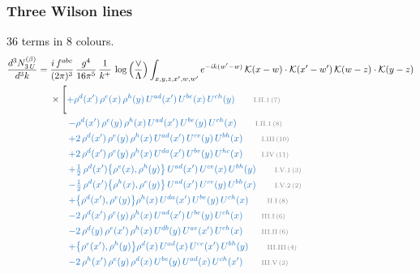 \documentclass[10pt]{article}
\begin{document}
\subsubsection{Three Wilson lines}
36 terms in 8 colours.
\begin{align}
\frac{d^{3}N^{(\beta)}_{3\,U}}{d^{3}k}={}&\frac{i\,f^{abc}}{(2\pi)^{3}}\,\frac{g^{4}}{16\pi^{5}}\,\frac{1}{k^{+}}\,\log\Big(\frac{\vee}{\Lambda}\Big)\int_{x,y,z,x',w,w'}e^{-ik(w'-w)}\,\mathcal{K}(x-w)\cdot\mathcal{K}(x'-w')\,\mathcal{K}(w-z)\cdot\mathcal{K}(y-z)\notag\\
&\times\Bigg[{\color{RoyalBlue}+\rho^{d}(x')\,\rho^{e}(x)\,\rho^{h}(y)\,U^{ad}(x')\,U^{be}(x)\,U^{ch}(y)}\tag*{\color{gray}\scriptsize I.II.1\,(7)}\\
&\qquad{\color{RoyalBlue}-\rho^{d}(x')\,\rho^{e}(y)\,\rho^{h}(x)\,U^{ad}(x')\,U^{be}(y)\,U^{ch}(x)}\tag*{\color{gray}\scriptsize I.II.1\,(8)}\\
&\qquad{\color{RoyalBlue}+2\,\rho^{d}(x')\,\rho^{e}(y)\,\rho^{h}(x)\,U^{ad}(x')\,U^{ce}(y)\,U^{bh}(x)}\tag*{\color{gray}\scriptsize I.III\,(10)}\\
&\qquad{\color{RoyalBlue}+2\,\rho^{d}(x')\,\rho^{e}(y)\,\rho^{h}(x)\, U^{da}(x')\,U^{be}(y)\,U^{hc}(x)}\tag*{\color{gray}\scriptsize I.IV\,(11)}\\
&\qquad{\color{RoyalBlue}+\tfrac{1}{2}\,\rho^{d}(x')\big\{\rho^{e}(x),\rho^{h}(y)\big\}\,U^{ad}(x')\,U^{ce}(x)\,U^{bh}(y)}\tag*{\color{gray}\scriptsize I.V.1\,(3)}\\
&\qquad{\color{RoyalBlue}-\tfrac{1}{2}\,\rho^{d}(x')\big\{\rho^{h}(x),\rho^{e}(y)\big\}\,U^{ad}(x')\,U^{ce}(y)\,U^{bh}(x)}\tag*{\color{gray}\scriptsize I.V.2\,(2)}\\
&\qquad{\color{RoyalBlue}+\big\{\rho^{d}(x'),\rho^{e}(y)\big\}\rho^{h}(x)\,U^{da}(x')\,U^{be}(y)\,U^{ch}(x)}\tag*{\color{gray}\scriptsize II.I\,(8)}\\
&\qquad{\color{RoyalBlue}-2\,\rho^{d}(x')\,\rho^{e}(y)\, \rho^{h}(x)\, U^{ad}(x')\,U^{be}(y)\,U^{ch}(x)}\tag*{\color{gray}\scriptsize III.I\,(6)}\\
&\qquad{\color{RoyalBlue}-2\,\rho^{d}(y)\,\rho^{e}(x')\, \rho^{h}(x)\, U^{db}(y)\,U^{ae}(x')\,U^{ch}(x)}\tag*{\color{gray}\scriptsize III.II\,(6)}\\
&\qquad{\color{RoyalBlue}+\big\{\rho^{e}(x'),\rho^{h}(y)\big\}\rho^{d}(x)\,U^{ad}(x)\,U^{ce}(x')\,U^{bh}(y)}\tag*{\color{gray}\scriptsize III.III\,(4)}\\
&\qquad{\color{RoyalBlue}-2\,\rho^{h}(x')\,\rho^{e}(y)\,\rho^{d}(x)\,U^{be}(y)\,U^{ad}(x)\,U^{ch}(x')}\tag*{\color{gray}\scriptsize III.V\,(3)}\\

\end{align}
\end{document}
